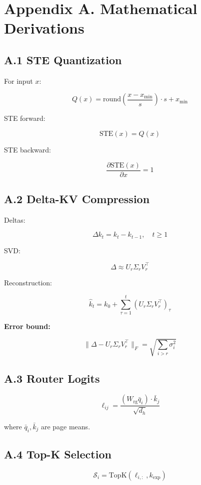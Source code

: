 \section{Appendix A. Mathematical Derivations}

\subsection{A.1 STE Quantization}

For input $x$:

\[
Q(x) = \text{round}\!\left(\frac{x - x_\text{min}}{s}\right) \cdot s + x_\text{min}
\tag{A.1}
\]

STE forward:

\[
\text{STE}(x) = Q(x)
\tag{A.2}
\]

STE backward:

\[
\frac{\partial \text{STE}(x)}{\partial x} = 1
\tag{A.3}
\]

\subsection{A.2 Delta-KV Compression}

Deltas:

\[
\Delta k_t = k_t - k_{t-1}, \quad t \geq 1
\tag{A.4}
\]

SVD:

\[
\Delta \approx U_r \Sigma_r V_r^\top
\tag{A.5}
\]

Reconstruction:

\[
\hat{k}_t = k_0 + \sum_{\tau=1}^t (U_r \Sigma_r V_r^\top)_\tau
\tag{A.6}
\]

\textbf{Error bound:}

\[
\|\Delta - U_r \Sigma_r V_r^\top\|_F = \sqrt{\sum_{i > r} \sigma_i^2}
\tag{A.7}
\]

\subsection{A.3 Router Logits}

\[
\ell_{ij} = \frac{(W_\text{rg} \bar{q}_i) \cdot \bar{k}_j}{\sqrt{d_h}}
\tag{A.8}
\]

where $\bar{q}_i, \bar{k}_j$ are page means.

\subsection{A.4 Top-K Selection}

\[
\mathcal{S}_i = \text{TopK}(\ell_{i, :}, k_\text{exp})
\tag{A.9}
\]

